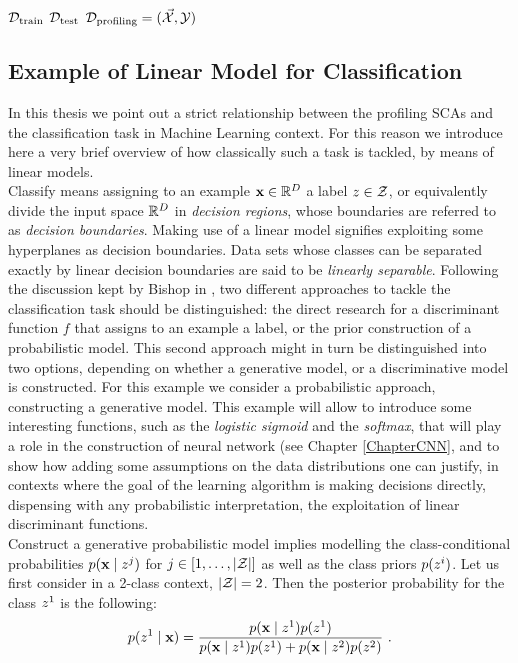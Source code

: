 $\mathcal{D}_{\text{train}}$  $\mathcal{D}_{\text{test}}$ $\mathcal{D}_{\text{profiling}}=(\vec{\mathcal{X}},{\mathcal{Y}})$
\subsection{Example of Linear Model for Classification}
In this thesis we point out a strict relationship between the profiling SCAs and the classification task in Machine Learning context. For this reason we introduce here a very brief overview of how classically such a task is tackled, by means of linear models. \\
Classify means assigning to an example $\textbf{x}\in\mathbb{R}^D$ a label $z\in \mathcal{Z}$, or equivalently divide the input space $\mathbb{R}^D$ in \emph{decision regions}, whose boundaries are referred to as \emph{decision boundaries}. Making use of a linear model signifies exploiting some hyperplanes as decision boundaries. Data sets whose classes can be separated exactly by linear decision boundaries are said to be \emph{linearly separable}. Following the discussion kept by Bishop in \cite{christopher2006pattern}, two different approaches to tackle the classification task should be distinguished: the direct research for a discriminant function $f$ that assigns to an example a label, or the prior construction of a probabilistic model. This second approach might in turn be distinguished into two options, depending on whether a generative model, or a discriminative model is constructed. For this example we consider a probabilistic approach, constructing a generative model. This example will allow to introduce some interesting functions, such as the \emph{logistic sigmoid} and the \emph{softmax}, that will play a role in the construction of neural network (see Chapter \ref{ChapterCNN}, and to show how adding some assumptions on the data distributions one can justify, in contexts where the goal of the learning algorithm is making decisions directly, dispensing with any probabilistic interpretation, the exploitation of linear discriminant functions. \\
Construct a generative probabilistic model implies modelling the class-conditional probabilities $p(\textbf{x}\mid z^j)$ for $j\in [1,\dots,\lvert\mathcal{Z}\rvert]$ as well as the class priors $p(z^i)$. Let us first consider in a 2-class context, \ie $\lvert\mathcal{Z}\rvert = 2$. Then the posterior probability for the class $z^1$ is the following:
\begin{equation}\label{eq:post_probs}
p(z^1\mid \textbf{x}) = \frac{p(\textbf{x}\mid z^1)p(z^1)}{p(\textbf{x}\mid z^1)p(z^1) + p(\textbf{x}\mid z^2)p(z^2)}\mbox{ .}
\end{equation}
